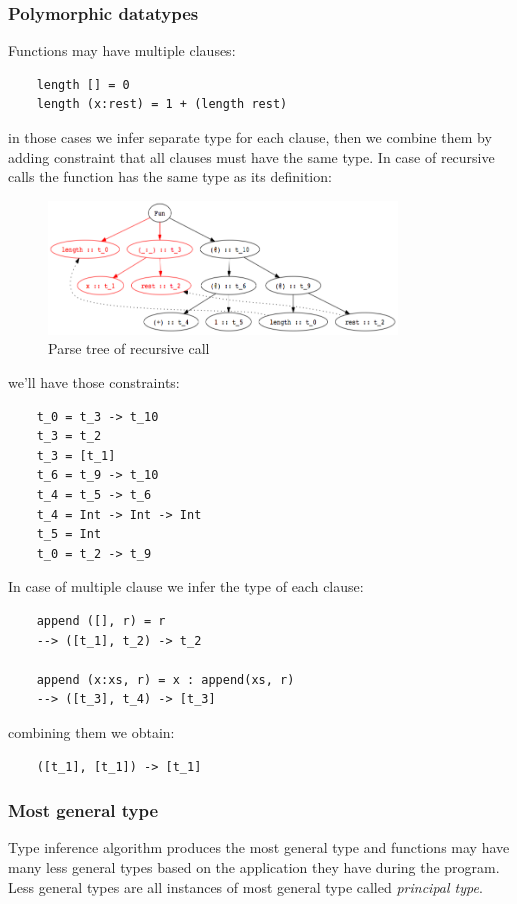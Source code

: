 \subsubsection{Polymorphic datatypes}
Functions may have multiple clauses:
\begin{verbatim}
    length [] = 0
    length (x:rest) = 1 + (length rest)
\end{verbatim}
in those cases we infer separate type for each clause, then we combine them by adding constraint that all clauses must have the same type.
In case of recursive calls the function has the same type as its definition:
\begin{figure}[H]
    \centering
    \includegraphics[width=350px]{images/7_Functional_Programming/type_inference_recursive.png}
    \caption{Parse tree of recursive call}
\end{figure}
we'll have those constraints:
\begin{verbatim}
    t_0 = t_3 -> t_10
    t_3 = t_2
    t_3 = [t_1]
    t_6 = t_9 -> t_10
    t_4 = t_5 -> t_6
    t_4 = Int -> Int -> Int
    t_5 = Int
    t_0 = t_2 -> t_9
\end{verbatim}

In case of multiple clause we infer the type of each clause:
\begin{verbatim}
    append ([], r) = r
    --> ([t_1], t_2) -> t_2

    append (x:xs, r) = x : append(xs, r)
    --> ([t_3], t_4) -> [t_3]
\end{verbatim}
combining them we obtain:
\begin{verbatim}
    ([t_1], [t_1]) -> [t_1]
\end{verbatim}

\subsubsection{Most general type}
Type inference algorithm produces the most general type and functions may have many less general types based on the application they have during the program.
Less general types are all instances of most general type called \emph{principal type}.

